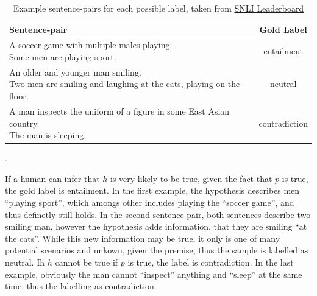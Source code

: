 \begin{table}[tph!]
\centering
\begin{tabular}{lc}
\textbf{Sentence-pair} & \textbf{Gold Label} \\
\toprule
\specialcell{A soccer game with multiple males playing.\\Some men are playing sport.} & entailment \\
\midrule
\specialcell{An older and younger man smiling.\\Two men are smiling and laughing at the cats, playing on the floor.} & neutral \\
\midrule
\specialcell{A man inspects the uniform of a figure in some East Asian country.\\The man is sleeping.} & contradiction\\
\bottomrule
\end{tabular}
\caption{Example sentence-pairs for each possible label, taken from \href{https://nlp.stanford.edu/projects/snli/}{SNLI Leaderboard}}.
\label{tab:label_examples}
\end{table}
If a human can infer that $h$ is very likely to be true, given the fact that $p$ is true, the gold label is entailment. In the first example, the hypothesis describes men ``playing sport'', which amongs other includes playing the ``soccer game'', and thus definetly still holds. In the second sentence pair, both sentences describe two smiling man, however the hypothesis adds information, that they are smiling ``at the cats''. While this new information may be true, it only is one of many potential scenarios and unkown, given the premise, thus the sample is labelled as neutral. Ih $h$ cannot be true if $p$ is true, the label is contradiction. In the last example, obviously the man cannot ``inspect'' anything and ``sleep'' at the same time, thus the labelling as contradiction.

